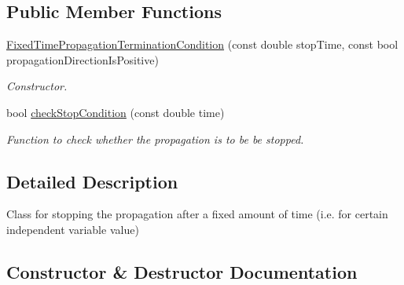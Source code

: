 \subsection*{Public Member Functions}
\begin{DoxyCompactItemize}
\item 
\hyperlink{classtudat_1_1propagators_1_1FixedTimePropagationTerminationCondition_abece50cbcd9790be252ce5121d5174d5}{Fixed\+Time\+Propagation\+Termination\+Condition} (const double stop\+Time, const bool propagation\+Direction\+Is\+Positive)
\begin{DoxyCompactList}\small\item\em Constructor. \end{DoxyCompactList}\item 
bool \hyperlink{classtudat_1_1propagators_1_1FixedTimePropagationTerminationCondition_abb0134403600810ccedd54e6a88e0337}{check\+Stop\+Condition} (const double time)
\begin{DoxyCompactList}\small\item\em Function to check whether the propagation is to be be stopped. \end{DoxyCompactList}\end{DoxyCompactItemize}


\subsection{Detailed Description}
Class for stopping the propagation after a fixed amount of time (i.\+e. for certain independent variable value) 

\subsection{Constructor \& Destructor Documentation}
